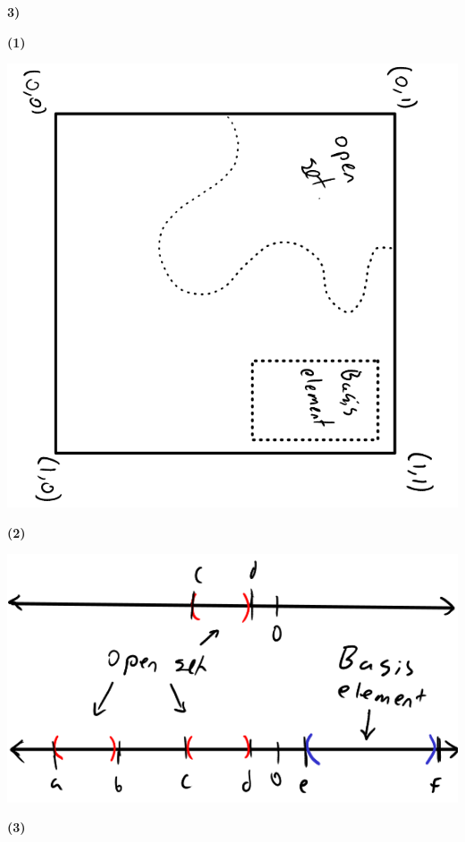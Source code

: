 \documentclass[12pt]{report}
\begin{document}
\newpage\noindent\textbf{3)}

\textbf{(1)}

	\begin{center}\includegraphics[scale=.7,angle=90]{pic4.png}\end{center}

\textbf{(2)}

	\begin{center}\includegraphics[scale=.7]{pic5.png}\end{center}

\newpage\textbf{(3)}
\end{document}
